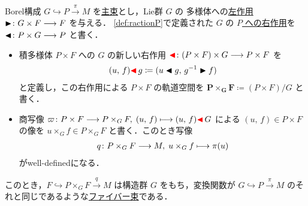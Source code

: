 \documentclass[TQFT_main]{subfiles}
\begin{document}
\begin{myprop}[label=prop:Borelconst]{Borel構成}
    $G \hookrightarrow P \xrightarrow{\pi} M$ を\hyperref[def.PFD]{主束}とし，Lie群 $G$ の \cinfty 多様体への\hyperref[def:Lie-action]{左作用} $\blacktriangleright \colon G \times F \longrightarrow F$ を与える．
    \eqref{def:ractionP}で定義された $G$ の \underline{$P$ への右作用}を $\blacktriangleleft \colon P \times G \longrightarrow P$ と書く．
    \begin{itemize}
        \item 積多様体 $P \times F$ への $G$ の新しい右作用 $\textcolor{red}{\blacktriangleleft} \colon (P \times F) \times G \longrightarrow P \times F$ を
        \begin{align}
            (u,\, f) \textcolor{red}{\blacktriangleleft}\, g \coloneqq (u \blacktriangleleft g,\, g^{-1} \blacktriangleright f)
        \end{align}
        と定義し，この右作用による $P \times F$ の軌道空間を $\bm{P \times_G F} \coloneqq (P \times F) / G$ と書く．
        \item 商写像 $\varpi\colon P \times F \longrightarrow P \times _G F,\; (u,\, f) \longmapsto (u,\, f) \textcolor{red}{\blacktriangleleft}\, G$ による $(u,\, f) \in P \times F$ の像を $u \times_G f \in P \times_G F$ と書く．このとき写像
        \begin{align}
            q \colon P \times_G F \longrightarrow M,\; u \times_G f \longmapsto \pi (u)
        \end{align}
        がwell-definedになる．
    \end{itemize}
    このとき，$F \hookrightarrow P \times_G F \xrightarrow{q} M$ は構造群 $G$ をもち，変換関数が $G \hookrightarrow P \xrightarrow{\pi} M$ のそれと同じであるような\hyperref[def.fiber-1]{ファイバー束}である．
\end{myprop}
\end{document}
